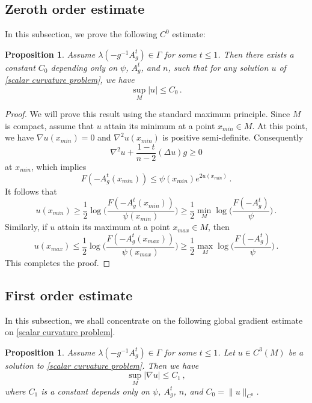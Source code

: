\documentclass{article}
\theoremstyle{plain}
\newtheorem{proposition}[theorem]{Proposition}
\theoremstyle{definition}
\theoremstyle{definition}
\numberwithin{equation}{section}
\begin{document}
\begin{sloppypar}
\subsection{Zeroth order estimate}
In this subsection, we prove the following $C^{0}$ estimate:
\begin{proposition}
Assume $\lambda(-g^{-1}A_{g}^{t})\in \Gamma$ for some $t\leq 1$. Then there exists a constant $C_{0}$ depending only on $\psi$, $A_{g}^{t}$, and $n$, such that for any solution $u$ of \eqref{scalar curvature problem}, we have
\begin{equation*}
\sup_{M}|u|\leq C_{0}\,.
\end{equation*}
\end{proposition}
\begin{proof}
We will prove this result using the standard maximum principle. Since $M$ is compact,   assume that $u$ attain its minimum at a point $x_{min}\in M$. At this point, we have $\nabla u(x_{min})=0$ and $\nabla^2 u(x_{min})$ is positive semi-definite. Consequently
\[\nabla^2u+\frac{1-t}{n-2}(\Delta u)g\geq 0\]
at $x_{min}$, which implies
\[
F(-A^{t}_{g}(x_{min}))\leq \psi(x_{min})e^{2u(x_{min})}\,.
\]
It follows that
\[
u(x_{min})\geq \frac{1}{2}\log \bigg(\frac{F(-A^{t}_{g}(x_{min}))}{\psi(x_{min})} \bigg)\geq \frac{1}{2}\min_{M}\log \bigg(\frac{F(-A^{t}_{g})}{\psi} \bigg)\,.
\]
Similarly, if $u$ attain its maximum at a point $x_{max}\in M$, then
\[
u(x_{max})\leq \frac{1}{2}\log \bigg(\frac{F(-A^{t}_{g}(x_{max}))}{\psi(x_{max})} \bigg)\geq \frac{1}{2}\max_{M}\log \bigg(\frac{F(-A^{t}_{g})}{\psi} \bigg)\,.
\]
This completes the proof.
\end{proof}







\subsection{First order estimate}


In this subsection, we shall concentrate on the following global gradient estimate on  \eqref{scalar curvature problem}.
\begin{proposition}\label{gradient estimate}
Assume  $\lambda(-g^{-1}A_{g}^{t})\in \Gamma$ for some $t\leq 1$. Let $u\in C^{3}(M)$ be a solution to  \eqref{scalar curvature problem}. Then we have
\begin{equation*}
\sup_{M}|\nabla u|\leq C_{1}\,,
\end{equation*}
where $C_{1}$ is a constant depends only on $\psi$, $A_{g}^{t}$, $n$, and   $C_{0}=\|u\|_{C^{0}}$.
\end{proposition}


\end{sloppypar}
\end{document}
